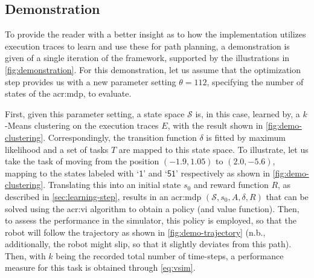 \newpage

\subsection{Demonstration}
\label{sec:demonstration}

To provide the reader with a better insight as to how the implementation utilizes execution traces to learn  and use these for path planning, a demonstration is given of a single iteration of the framework, supported by the illustrations in \autoref{fig:demonstration}.
For this demonstration, let us assume that the optimization step provides us with a new parameter setting $\theta = 112$, specifying the number of states of the \acrshort{acr:mdp}, to evaluate.

First, given this parameter setting, a state space $\mathcal{S}$ is, in this case, learned by, a $k$-Means clustering on the execution traces $E$, with the result shown in \autoref{fig:demo-clustering}.
Correspondingly, the transition function $\delta$ is fitted by maximum likelihood and a set of tasks $T$ are mapped to this state space.
To illustrate, let us take the task of moving from the position $(-1.9, 1.05)$ to $(2.0, -5.6)$, mapping to the states labeled with `$\mathsf{1}$' and `$\mathsf{51}$' respectively as shown in \autoref{fig:demo-clustering}.
Translating this into an initial state $s_0$ and reward function $R$, as described in \autoref{sec:learning-step}, results in an \acrshort{acr:mdp} $(\mathcal{S}, s_0, A, \delta, R)$ that can be solved using the \acrshort{acr:vi} algorithm to obtain a policy (and value function).
Then, to assess the performance in the simulator, this policy is employed, so that the robot will follow the trajectory as shown in \autoref{fig:demo-trajectory} (n.b., additionally, the robot might slip, so that it slightly deviates from this path).
Then, with $k$ being the recorded total number of time-steps, a performance measure for this task is obtained through \autoref{eq:vsim}.

%

